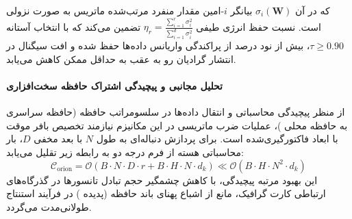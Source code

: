 
که در آن $\sigma_i(\mathbf{W})$ بیانگر $i$-امین مقدار منفرد مرتب‌شده ماتریس به صورت نزولی است. نسبت حفظ انرژی طیفی $\eta_r = \frac{\sum_{i=1}^r \sigma_i^2}{\sum_{i=1}^{d} \sigma_i^2}$ تضمین می‌کند که با انتخاب آستانه $\tau \ge 0.90$، بیش از نود درصد از پراکندگی واریانس داده‌ها حفظ شده و افت سیگنال در انتشار گرادیان رو به عقب به حداقل ممکن کاهش می‌یابد.

\paragraph{تحلیل مجانبی و پیچیدگی اشتراک حافظه سخت‌افزاری}
از منظر پیچیدگی محاسباتی و انتقال داده‌ها در سلسومراتب حافظه (حافظه سراسری  به حافظه محلی )، عملیات ضرب ماتریسی در این مکانیزم نیازمند تخصیص بافر موقت با ابعاد فاکتورگیری‌شده است. برای پردازش دنباله‌ای به طول $N$ با بعد مخفی $D$، بار محاسباتی هسته از فرم درجه دو به رابطه زیر تقلیل می‌یابد:
\begin{equation}
\label{eq:complexity_orion}
\mathcal{C}_{\text{orion}} = \mathcal{O}\left( B \cdot N \cdot D \cdot r + B \cdot H \cdot N \cdot d_k \right) \ll \mathcal{O}\left( B \cdot H \cdot N^2 \cdot d_k \right)
\end{equation}
این بهبود مرتبه پیچیدگی، با کاهش چشمگیر حجم تبادل تانسورها در گذرگاه‌های ارتباطی کارت گرافیک، مانع از اشباع پهنای باند حافظه (پدیده ) در فرآیند استنتاج طولانی‌مدت می‌گردد.